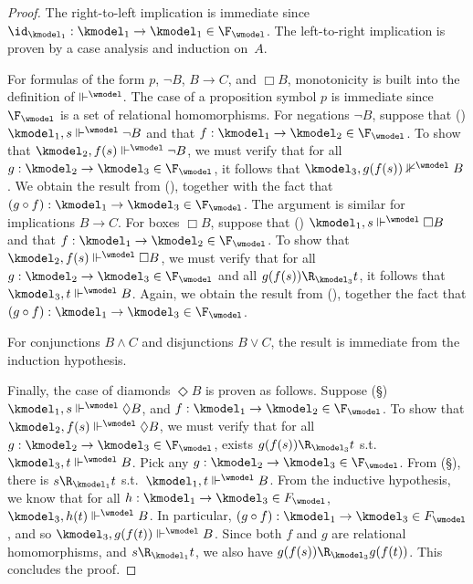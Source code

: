 \begin{proof}
  The right-to-left implication is immediate since ${\id_{\kmodel_1}: \kmodel_1 \to \kmodel_1} \in \F_{\wmodel}$.
  The left-to-right implication is proven by a case analysis and induction on~$A$.

  \medskip
  \noindent
  For formulas of the form $p$, $\lnot B$, $B \to C$, and $\Box B$, monotonicity is built into the definition of $\Vdash^{\wmodel}$.
  The case of a proposition symbol $p$ is immediate since $\F_{\wmodel}$ is a set of relational homomorphisms.
  For negations $\lnot B$, suppose that (\dag) $\kmodel_1, s \Vdash^{\wmodel} \lnot B$ and that ${f: \kmodel_1 \to \kmodel_2} \in \F_{\wmodel}$.
  To show that $\kmodel_2, f(s) \Vdash^{\wmodel} \lnot B$, we must verify that for all ${g: \kmodel_2 \to \kmodel_3} \in \F_{\wmodel}$, it follows that $\kmodel_3, g(f(s)) \nVdash^{\wmodel} B$.
  We obtain the result from (\dag), together with the fact that ${{(g \circ f): \kmodel_1 \to \kmodel_3} \in \F_{\wmodel}}$.
  The argument is similar for implications $B \to C$.
  For boxes $\Box B$, suppose that (\ddag) $\kmodel_1, s \Vdash^{\wmodel} \Box B$ and that ${f: \kmodel_1 \to \kmodel_2} \in \F_{\wmodel}$.
  To show that $\kmodel_2, f(s) \Vdash^{\wmodel} \Box B$, we must verify that for all ${g: \kmodel_2 \to \kmodel_3} \in \F_{\wmodel}$ and all $g(f(s)) \R_{\kmodel_3} t$, it follows that $\kmodel_3, t \Vdash^{\wmodel} B$.
  Again, we obtain the result from (\ddag), together the fact that ${(g \circ f): \kmodel_1 \to \kmodel_3} \in \F_{\wmodel}$.

  \medskip
  \noindent
  For conjunctions $B \land C$ and disjunctions $B \lor C$, the result is immediate from the induction hypothesis.

  \medskip
  \noindent
  Finally, the case of diamonds $\Diamond B$ is proven as follows.
  Suppose (\S) ${\kmodel_1, s \Vdash^{\wmodel} \Diamond B}$, and ${f: \kmodel_1 \to \kmodel_2} \in \F_{\wmodel}$.
  To show that $\kmodel_2, f(s) \Vdash^{\wmodel} \Diamond B$, we must verify that for all ${g: \kmodel_2 \to \kmodel_3} \in \F_{\wmodel}$, exists $g(f(s)) \R_{\kmodel_3} t$ s.t.\ ${\kmodel_3, t \Vdash^{\wmodel} B}$.
  Pick any ${g: \kmodel_2 \to \kmodel_3} \in \F_{\wmodel}$.
  From (\S), there is $s \R_{\kmodel_1} t$ s.t.\ $\kmodel_1, t \Vdash^{\wmodel} B$.
  From the inductive hypothesis, we know that for all ${h: \kmodel_1 \to \kmodel_3} \in F_{\wmodel}$, $\kmodel_3, h(t) \Vdash^{\wmodel} B$.
  In particular, ${(g \circ f): \kmodel_1 \to \kmodel_3} \in F_{\wmodel}$, and so $\kmodel_3, g(f(t)) \Vdash^{\wmodel} B$.
  Since both $f$ and $g$ are relational homomorphisms, and $s \R_{\kmodel_1} t$, we also have $g(f(s)) \R_{\kmodel_3} g(f(t))$.
  This concludes the proof.
\end{proof}

